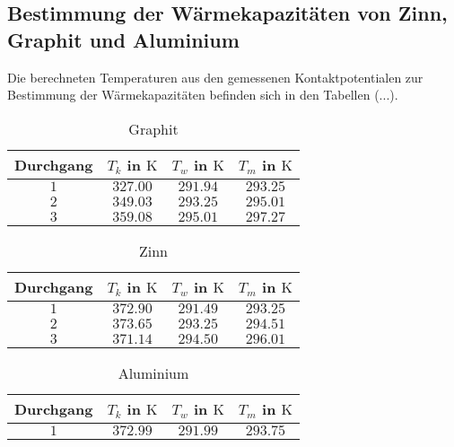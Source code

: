 \subsection{Bestimmung der Wärmekapazitäten von Zinn, Graphit und Aluminium}
Die berechneten Temperaturen aus den gemessenen Kontaktpotentialen zur Bestimmung der Wärmekapazitäten befinden sich in den Tabellen (...).
\begin{table}
  \centering
  \begin{tabular}{S S S S}
      \toprule
    {Durchgang} &  {$T_k$ in $\si{\kelvin}$} & {$T_w$ in $\si{\kelvin}$} &{$T_m$ in $\si{\kelvin}$}  \\
    \midrule
    {$1$} &  {$\num{327.00}$} & {$\num{291.94}$}  & {$\num{293.25}$}  \\
    {$2$} &  {$\num{349.03}$} & {$\num{293.25}$}  & {$\num{295.01}$}   \\
    {$3$} &  {$\num{359.08}$} & {$\num{295.01}$} &  {$\num{297.27}$}  \\
  \end{tabular}
  \caption{Graphit}
  \label{tab: graphit}
\end{table}


\begin{table}
  \centering
  \begin{tabular}{S S S S}
      \toprule
    {Durchgang} &  {$T_k$ in $\si{\kelvin}$} & {$T_w$ in $\si{\kelvin}$} &{$T_m$ in $\si{\kelvin}$}  \\
    \midrule
    {$1$} &  {$\num{372.90}$} & {$\num{291.49}$}  & {$\num{293.25}$}  \\
    {$2$} &  {$\num{373.65}$} & {$\num{293.25}$}  & {$\num{294.51}$}   \\
    {$3$} &  {$\num{371.14}$} & {$\num{294.50}$} &  {$\num{296.01}$}  \\
  \end{tabular}
  \caption{Zinn}
  \label{tab: zinn}
\end{table}



\begin{table}
  \centering
  \begin{tabular}{S S S S}
      \toprule
    {Durchgang} &  {$T_k$ in $\si{\kelvin}$} & {$T_w$ in $\si{\kelvin}$} &{$T_m$ in $\si{\kelvin}$}  \\
    \midrule
    {$1$} &  {$\num{372.99}$} & {$\num{291.99}$}  & {$\num{293.75}$}  \\
  \end{tabular}
  \caption{Aluminium}
  \label{tab: alu}
\end{table}

